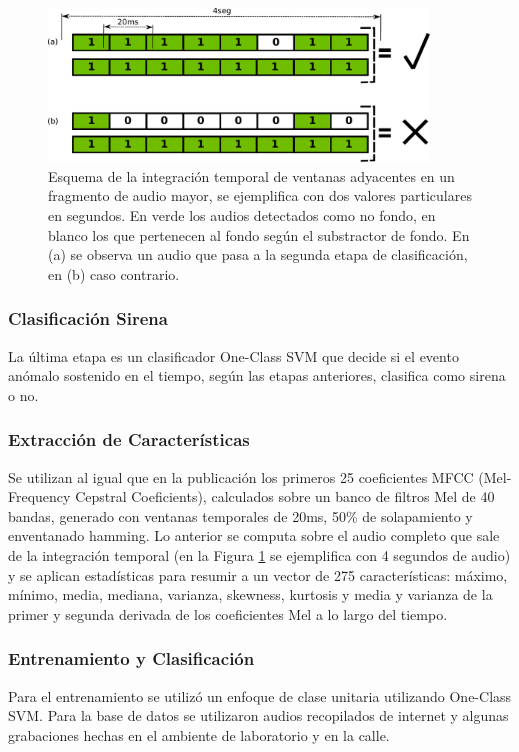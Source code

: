 \documentclass{article}
\begin{document}
\begin{figure}[h]
\begin{center}
\includegraphics[width=0.9\textwidth]{integracion_temporal} 
\caption{Esquema de la integración temporal de ventanas adyacentes en un fragmento de audio mayor, se ejemplifica con dos valores particulares en segundos. En verde los audios detectados como no fondo, en blanco los que pertenecen al fondo según el substractor de fondo. En (a) se observa un audio que pasa a la segunda etapa de clasificación, en (b) caso contrario.}
\label{fig:integracion_temporal}
\end{center}
\end{figure}
 
\subsubsection{Clasificación Sirena}
La última etapa es un clasificador One-Class SVM que decide si el evento anómalo sostenido en el tiempo, según las etapas anteriores, clasifica como sirena o no. 

\subsubsection*{Extracción de Características}
Se utilizan al igual que en la publicación \cite{Salamon:UrbanSound:ACMMM:14} los primeros 25 coeficientes MFCC (Mel-Frequency Cepstral Coeficients), calculados sobre un banco de filtros Mel de 40 bandas, generado con ventanas temporales de 20ms, 50\% de solapamiento y enventanado hamming. Lo anterior se computa sobre el audio completo que sale de la integración temporal (en la Figura \ref{fig:integracion_temporal} se ejemplifica con 4 segundos de audio) y se aplican estadísticas para resumir a un vector de 275 características: máximo, mínimo, media, mediana, varianza, skewness, kurtosis y media y varianza de la primer y segunda derivada de los coeficientes Mel a lo largo del tiempo.

\subsubsection*{Entrenamiento y Clasificación}
Para el entrenamiento se utilizó un enfoque de clase unitaria utilizando One-Class SVM. Para la base de datos se utilizaron audios recopilados de internet y algunas grabaciones hechas en el ambiente de laboratorio y en la calle. 
\end{document}
